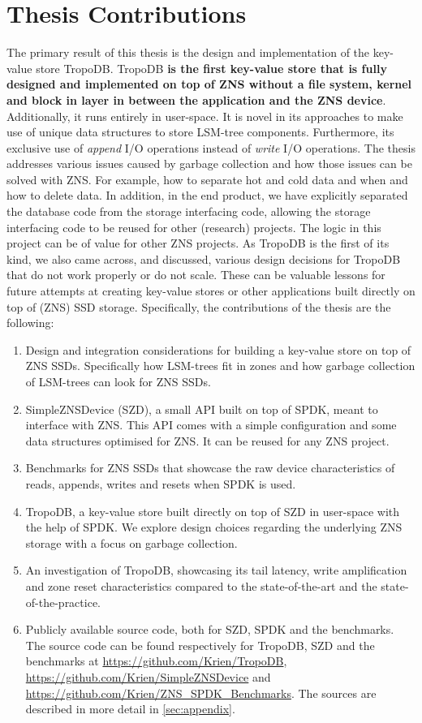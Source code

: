 \section{Thesis Contributions}
\label{sec:contrib}
The primary result of this thesis is the design and implementation of the key-value store TropoDB. TropoDB \textbf{is the first key-value store that is fully designed and implemented on top of ZNS without a file system, kernel and block in layer in between the application and the ZNS device}. Additionally, it runs entirely in user-space. It is novel in its approaches to make use of unique data structures to store LSM-tree components. Furthermore, its exclusive use of \textit{append} I/O operations instead of \textit{write} I/O operations. The thesis addresses various issues caused by garbage collection and how those issues can be solved with ZNS. For example, how to separate hot and cold data and when and how to delete data. In addition, in the end product, we have explicitly separated the database code from the storage interfacing code, allowing the storage interfacing code to be reused for other (research) projects. The logic in this project can be of value for other ZNS projects. As TropoDB is the first of its kind, we also came across, and discussed, various design decisions for TropoDB that do not work properly or do not scale. These can be valuable lessons for future attempts at creating key-value stores or other applications built directly on top of (ZNS) SSD storage. Specifically, the contributions of the thesis are the following:
\begin{enumerate}
    \item Design and integration considerations for building a key-value store on top of ZNS SSDs. Specifically how LSM-trees fit in zones and how garbage collection of LSM-trees can look for ZNS SSDs.
    \item SimpleZNSDevice (SZD), a small API built on top of SPDK, meant to interface with ZNS. This API comes with a simple configuration and some data structures optimised for ZNS. It can be reused for any ZNS project.
    \item Benchmarks for ZNS SSDs that showcase the raw device characteristics of reads, appends, writes and resets when SPDK is used.
    \item TropoDB, a key-value store built directly on top of SZD in user-space with the help of SPDK. We explore design choices regarding the underlying ZNS storage with a focus on garbage collection. 
    \item An investigation of TropoDB, showcasing its tail latency, write amplification and zone reset characteristics compared to the state-of-the-art and the state-of-the-practice.
    \item Publicly available source code, both for SZD, SPDK and the benchmarks. The source code can be found respectively for TropoDB, SZD and the benchmarks at \url{https://github.com/Krien/TropoDB},  \url{https://github.com/Krien/SimpleZNSDevice} and \url{https://github.com/Krien/ZNS_SPDK_Benchmarks}. The sources are described in more detail in \autoref{sec:appendix}.
\end{enumerate}

